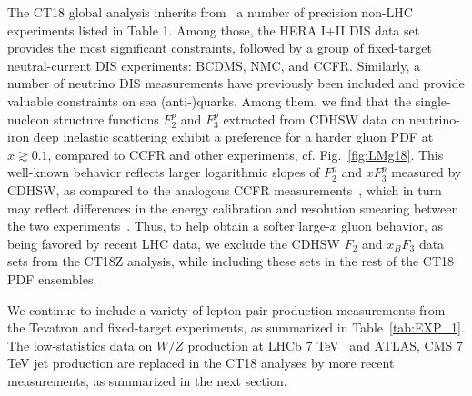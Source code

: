 The CT18 global analysis inherits from \CTHERAII~a number of precision non-LHC experiments listed in Table 1. Among those, the 
HERA I+II DIS data set provides the most significant constraints, followed by a group of fixed-target neutral-current DIS experiments: BCDMS, NMC, and CCFR.
Similarly, a number of neutrino DIS measurements have previously been included
and provide valuable constraints on sea (anti-)quarks.
Among them, we find that the single-nucleon structure functions $F_2^p$ and $F_3^p$ extracted from CDHSW data on neutrino-iron 
deep inelastic scattering exhibit a preference for a harder gluon PDF at $x \gtrsim 0.1$, compared to CCFR and other experiments, cf. Fig.~\ref{fig:LMg18}. 
This well-known behavior reflects  larger logarithmic slopes of $F_2^p$ and $x F_3^p$ measured by CDHSW, as compared to the 
analogous CCFR measurements~\cite{Seligman:1997fe}, which in turn may reflect differences in the energy calibration and resolution smearing between the two experiments~\cite{Bodek:1996zu}. 
Thus, to help obtain a softer large-$x$ gluon behavior, as being favored by recent LHC data, we exclude the CDHSW $F_2$ and $x_B F_3$ data sets from the CT18Z analysis, while including these sets in the rest of the CT18 PDF ensembles. 

We continue to include a variety of lepton pair production measurements from the Tevatron and fixed-target 
experiments, as summarized in Table~\ref{tab:EXP_1}. The low-statistics data on $W/Z$ production at 
LHCb 7 TeV~\cite{Aaij:2012vn} and ATLAS, CMS 7 TeV jet production \cite{Aad:2011fc, Chatrchyan:2012bja} 
are replaced in the CT18 analyses by more recent measurements, as summarized in the next section. 

